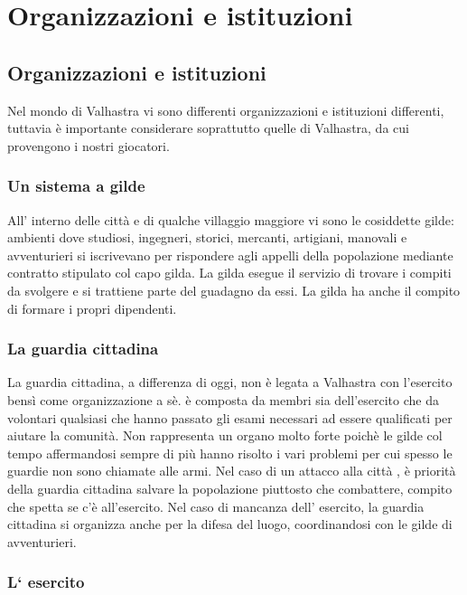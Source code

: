 \documentclass[a4paper,12pt]{book}
\begin{document}
\saltariga
\chapter{Organizzazioni e istituzioni}
\section{Organizzazioni e istituzioni}

Nel mondo di Valhastra vi sono differenti organizzazioni e istituzioni differenti, tuttavia è importante considerare soprattutto quelle di Valhastra, da cui provengono i nostri giocatori.

\subsection{Un sistema a gilde}

All' interno delle città e di qualche villaggio maggiore vi sono le cosiddette gilde: ambienti dove studiosi, ingegneri, storici, mercanti, artigiani, manovali e avventurieri si iscrivevano per rispondere agli appelli della popolazione mediante contratto stipulato col capo gilda. La gilda esegue il servizio di trovare i compiti da svolgere e si trattiene parte del guadagno da essi.
La gilda ha anche il compito di formare i propri dipendenti.

\subsection{La guardia cittadina}

La guardia cittadina, a differenza di oggi, non è legata a Valhastra con l'esercito bensì come organizzazione a sè.
è composta da membri sia dell'esercito che da volontari qualsiasi che hanno passato gli esami necessari ad essere qualificati per aiutare la comunità. Non rappresenta un organo molto forte poichè le gilde col tempo affermandosi sempre di più hanno risolto i vari problemi per cui spesso le guardie non sono chiamate alle armi.
Nel caso di un attacco alla città , è priorità della guardia cittadina salvare la popolazione piuttosto che combattere, compito che spetta se c'è all'esercito. Nel caso di mancanza dell' esercito, la guardia cittadina si organizza anche per la difesa del luogo, coordinandosi con le gilde di avventurieri.

\subsection{L` esercito}
\end{document}
